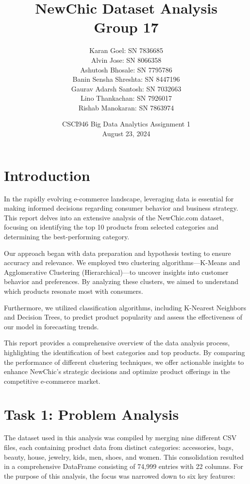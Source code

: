 \documentclass[a4paper,11pt]{article}
\title{NewChic Dataset Analysis\\ Group 17}
\author{
    Karan Goel: SN 7836685\\
    Alvin Jose: SN 8066358 \\
    Ashutosh Bhosale: SN 7795786 \\
    Banin Sensha Shreshta: SN 8447196 \\
    Gaurav Adarsh Santosh: SN 7032663 \\
    Lino Thankachan: SN 7926017 \\
    Rishab Manokaran: SN 7863974 
}
\date{CSCI946 Big Data Analytics Assignment 1\\
August 23, 2024}
\begin{document}
\maketitle
\newpage
\section{Introduction}
\label{sec:introduction}

In the rapidly evolving e-commerce landscape, leveraging data is essential for making informed decisions regarding consumer behavior and business strategy. This report delves into an extensive analysis of the NewChic.com dataset, focusing on identifying the top 10 products from selected categories and determining the best-performing category.

Our approach began with data preparation and hypothesis testing to ensure accuracy and relevance. We employed two clustering algorithms—K-Means and Agglomerative Clustering (Hierarchical)—to uncover insights into customer behavior and preferences. By analyzing these clusters, we aimed to understand which products resonate most with consumers.

Furthermore, we utilized classification algorithms, including K-Nearest Neighbors and Decision Trees, to predict product popularity and assess the effectiveness of our model in forecasting trends.

This report provides a comprehensive overview of the data analysis process, highlighting the identification of best categories and top products. By comparing the performance of different clustering techniques, we offer actionable insights to enhance NewChic’s strategic decisions and optimize product offerings in the competitive e-commerce market.

\section{Task 1: Problem Analysis}

The dataset used in this analysis was compiled by merging nine different CSV files, each containing product data from distinct categories: accessories, bags, beauty, house, jewelry, kids, men, shoes, and women. This consolidation resulted in a comprehensive DataFrame consisting of 74,999 entries with 22 columns. For the purpose of this analysis, the focus was narrowed down to six key features:
\end{document}
